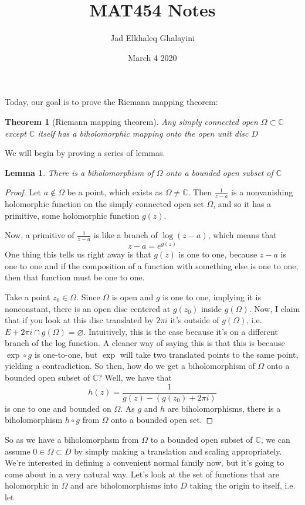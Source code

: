 \documentclass{article}
\title{MAT454 Notes}
\author{Jad Elkhaleq Ghalayini}
\date{March 4 2020}
\newtheorem{theorem}{Theorem}
\newtheorem{lemma}{Lemma}
\newcommand{\mbb}[1]{\mathbb{#1}}
\begin{document}
\maketitle

Today, our goal is to prove the Riemann mapping theorem:
\begin{theorem}[Riemann mapping theorem]
Any simply connected open \(\Omega \subset \mbb{C}\) except \(\mbb{C}\) itself has a biholomorphic mapping onto the open unit disc \(D\)
\end{theorem}
We will begin by proving a series of lemmas.
\begin{lemma}
There is a biholomorphism of \(\Omega\) onto a bounded open subset of \(\mbb{C}\)
\end{lemma}
\begin{proof}
Let \(a \notin \Omega\) be a point, which exists as \(\Omega \neq \mbb{C}\). Then \(\frac{1}{z - a}\) is a nonvanishing holomorphic function on the simply connected open set \(\Omega\), and so it has a primitive, some holomorphic function \(g(z)\).

Now, a primitive of \(\frac{1}{z - a}\) is like a branch of \(\log(z - a)\), which means that
\[z - a = e^{g(z)}\]
One thing this tells us right away is that \(g(z)\) is one to one, because \(z - a\) is one to one and if the composition of a function with something else is one to one, then that function must be one to one.

Take a point \(z_0 \in \Omega\). Since \(\Omega\) is open and \(g\) is one to one, implying it is nonconstant, there is an open disc centered at \(g(z_0)\) inside \(g(\Omega)\). Now, I claim that if you look at this disc translated by \(2\pi i\) it's outside of \(g(\Omega)\), i.e. \(E + 2\pi i \cap g(\Omega) = \varnothing\). Intuitively, this is the case because it's on a different branch of the log function. A cleaner way of saying this is that this is because \(\exp \circ g\) is one-to-one, but \(\exp\) will take two translated points to the same point, yielding a contradiction.
So then, how do we get a biholomorphism of \(\Omega\) onto a bounded open subset of \(\mbb{C}\)? Well, we have that
\[h(z) = \frac{1}{g(z) - (g(z_0) + 2\pi i)}\]
is one to one and bounded on \(\Omega\). As \(g\) and \(h\) are biholomorphisms, there is a biholomorphism \(h \circ g\) from \(\Omega\) onto a bounded open set.
\end{proof}
So as we have a biholomorphsm from \(\Omega\) to a bounded open subset of \(\mbb{C}\), we can assume \(0 \in \Omega \subset D\) by simply making a translation and scaling appropriately. We're interested in defining a convenient normal family now, but it's going to come about in a very natural way. Let's look at the set of functions that are holomorphic in \(\Omega\) and are biholomorphisms into \(D\) taking the origin to itself, i.e. let
\end{document}
